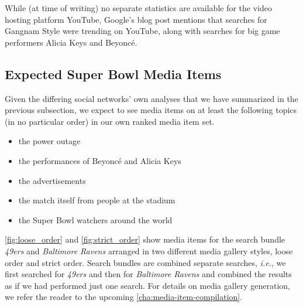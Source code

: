 While (at time of writing) no separate statistics are available
for the video hosting platform YouTube,
Google's blog post mentions that searches for Gangnam Style were trending on YouTube,
along with searches for big game performers Alicia Keys and Beyoncé.

\subsection{Expected Super Bowl Media Items}

Given the differing social networks' own analyses
that we have summarized in the previous subsection,
we expect to see media items
on at least the following topics (in no particular order)
in our own ranked media item set.

\begin{itemize}
  \itemsep0em
  \item the power outage
  \item the performances of Beyoncé and Alicia Keys
  \item the advertisements
  \item the match itself from people at the stadium
  \item the Super Bowl watchers around the world 
\end{itemize}

\autoref{fig:loose_order} and \autoref{fig:strict_order} show media items
for the search bundle \emph{49ers} and \emph{Baltimore Ravens} arranged
in two different media gallery styles, loose order and strict order.
Search bundles are combined separate searches, \emph{i.e.},
we first searched for \emph{49ers} and then for \emph{Baltimore Ravens}
and combined the results as if we had performed just one search.
For details on media gallery generation, we refer the reader to the upcoming
\autoref{cha:media-item-compilation}.

